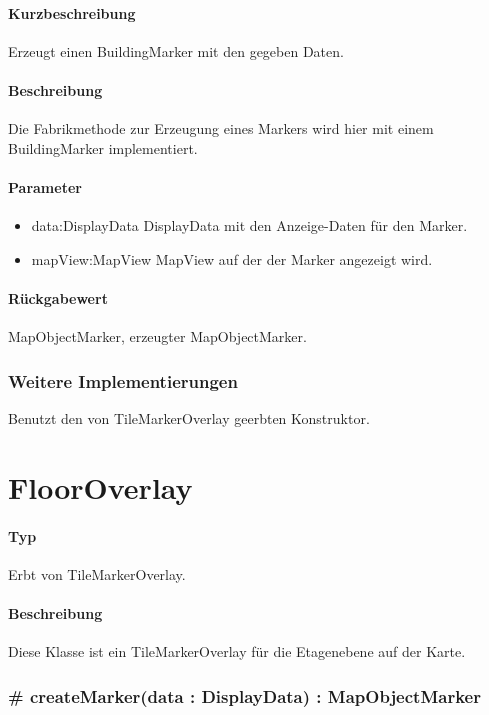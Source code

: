 \paragraph*{Kurzbeschreibung}
Erzeugt einen BuildingMarker mit den gegeben Daten.
\paragraph*{Beschreibung}
Die Fabrikmethode zur Erzeugung eines Markers wird hier mit einem BuildingMarker implementiert.
\paragraph*{Parameter}
\begin{itemize}
    \item data:DisplayData DisplayData mit den Anzeige-Daten für den Marker.
    \item mapView:MapView MapView auf der der Marker angezeigt wird.
\end{itemize}
\paragraph*{Rückgabewert}
MapObjectMarker, erzeugter MapObjectMarker.

\subsubsection{Weitere Implementierungen}%
Benutzt den von TileMarkerOverlay geerbten Konstruktor.

\section{FloorOverlay}
\paragraph*{Typ}
Erbt von TileMarkerOverlay.
\paragraph*{Beschreibung}
Diese Klasse ist ein TileMarkerOverlay für die Etagenebene auf der Karte.

\subsubsection{# createMarker(data : DisplayData) : MapObjectMarker}%
